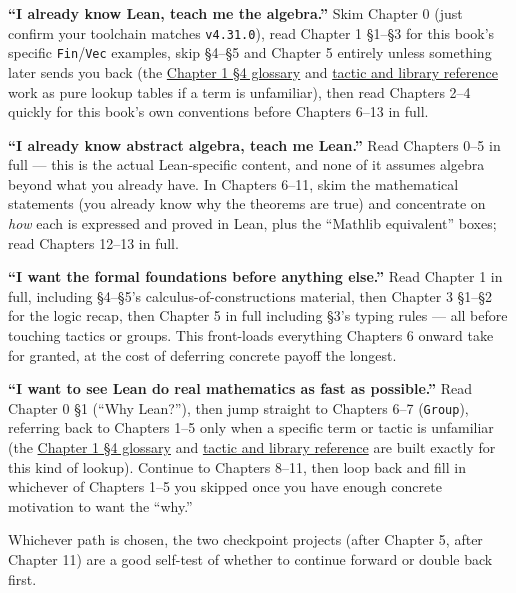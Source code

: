 \textbf{``I already know Lean, teach me the algebra.''} Skim Chapter 0 (just confirm your toolchain matches \texttt{v4.31.0}), read Chapter 1 §1--§3 for this book's specific \texttt{Fin}/\texttt{Vec} examples, skip §4--§5 and Chapter 5 entirely unless something later sends you back (the \hyperref[sec:01-basics:04-terminology:1]{Chapter 1 §4 glossary} and \hyperref[sec:root:tactic-and-library-reference:1]{tactic and library reference} work as pure lookup tables if a term is unfamiliar), then read Chapters 2--4 quickly for this book's own conventions before Chapters 6--13 in full.

\textbf{``I already know abstract algebra, teach me Lean.''} Read Chapters 0--5 in full --- this is the actual Lean-specific content, and none of it assumes algebra beyond what you already have. In Chapters 6--11, skim the mathematical statements (you already know why the theorems are true) and concentrate on \emph{how} each is expressed and proved in Lean, plus the ``Mathlib equivalent'' boxes; read Chapters 12--13 in full.

\textbf{``I want the formal foundations before anything else.''} Read Chapter 1 in full, including §4--§5's calculus-of-constructions material, then Chapter 3 §1--§2 for the logic recap, then Chapter 5 in full including §3's typing rules --- all before touching tactics or groups. This front-loads everything Chapters 6 onward take for granted, at the cost of deferring concrete payoff the longest.

\textbf{``I want to see Lean do real mathematics as fast as possible.''} Read Chapter 0 §1 (``Why Lean?''), then jump straight to Chapters 6--7 (\texttt{Group}), referring back to Chapters 1--5 only when a specific term or tactic is unfamiliar (the \hyperref[sec:01-basics:04-terminology:1]{Chapter 1 §4 glossary} and \hyperref[sec:root:tactic-and-library-reference:1]{tactic and library reference} are built exactly for this kind of lookup). Continue to Chapters 8--11, then loop back and fill in whichever of Chapters 1--5 you skipped once you have enough concrete motivation to want the ``why.''

Whichever path is chosen, the two checkpoint projects (after Chapter 5, after Chapter 11) are a good self-test of whether to continue forward or double back first.
